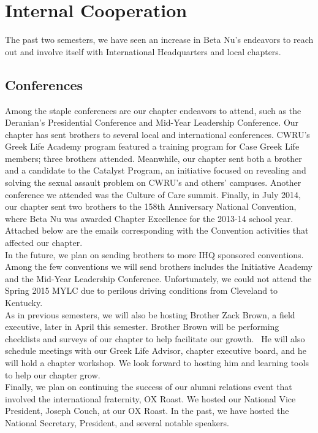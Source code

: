 \chapter{Internal Cooperation}
  The past two semesters, we have seen an increase in Beta Nu’s endeavors to reach out and involve itself with International Headquarters and local chapters. 
  
  \section*{Conferences}
    Among the staple conferences are our chapter endeavors to attend, such as the Deranian’s Presidential Conference and Mid-Year Leadership Conference. Our chapter has sent brothers to several local and international conferences. CWRU's Greek Life Academy program featured a training program for Case Greek Life members; three brothers attended. Meanwhile, our chapter sent both a brother and a candidate to the Catalyst Program, an initiative focused on revealing and solving the sexual assault problem on CWRU's and others' campuses. Another conference we attended was the Culture of Care summit. Finally, in July 2014, our chapter sent two brothers to the 158th Anniversary National Convention, where Beta Nu was awarded Chapter Excellence for the 2013-14 school year. Attached below are the emails corresponding with the Convention activities that affected our chapter. \\
    
    In the future, we plan on sending brothers to more IHQ sponsored conventions. Among the few conventions we will send brothers includes the Initiative Academy and the Mid-Year Leadership Conference. Unfortunately, we could not attend the Spring 2015 MYLC due to perilous driving conditions from Cleveland to Kentucky. \\
    
    As in previous semesters, we will also be hosting Brother Zack Brown, a field executive, later in April this semester. Brother Brown will be performing checklists and surveys of our chapter to help facilitate our growth.  He will also schedule meetings with our Greek Life Advisor, chapter executive board, and he will hold a chapter workshop. We look forward to hosting him and learning tools to help our chapter grow. \\
    
    Finally, we plan on continuing the success of our alumni relations event that involved the international fraternity, OX Roast. We hosted our National Vice President, Joseph Couch, at our OX Roast. In the past, we have hosted the National Secretary, President, and several notable speakers. 
    

